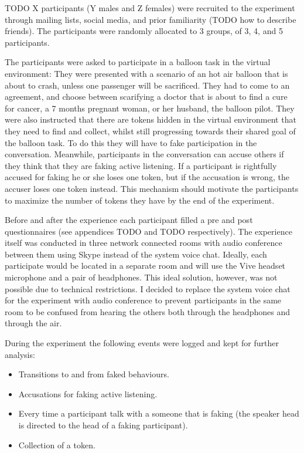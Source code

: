 \documentclass[]{simple-thesis}
\begin{document}
TODO X participants (Y males and Z females) were recruited to the experiment through mailing lists, social media, and prior familiarity (TODO how to describe friends).
The participants were randomly allocated to 3 groups, of 3, 4, and 5 participants.

The participants were asked to participate in a balloon task \citep{Howes2012} in the virtual environment:
They were presented with a scenario of an hot air balloon that is about to crash, unless one passenger will be sacrificed.
They had to come to an agreement, and choose between scarifying a doctor that is about to find a cure for cancer, a 7 months pregnant woman, or her husband, the balloon pilot.
They were also instructed that there are tokens hidden in the virtual environment that they need to find and collect, whilst still progressing towards their shared goal of the balloon task.
To do this they will have to fake participation in the conversation.
Meanwhile, participants in the conversation can accuse others if they think that they are faking active listening.
If a participant is rightfully accused for faking he or she loses one token, but if the accusation is wrong, the accuser loses one token instead.
This mechanism should motivate the participants to maximize the number of tokens they have by the end of the experiment.

Before and after the experience each participant filled a pre and post questionnaires (see appendices TODO and TODO respectively).
The experience itself was conducted in three network connected rooms with audio conference between them using Skype instead of the system voice chat.
Ideally, each participate would be located in a separate room and will use the Vive headset microphone and a pair of headphones.
This ideal solution, however, was not possible due to technical restrictions.
I decided to replace the system voice chat for the experiment with audio conference to prevent participants in the same room to be confused from hearing the others both through the headphones and through the air.

During the experiment the following events were logged and kept for further analysis:

\begin{itemize}
  \item Transitions to and from faked behaviours.
  \item Accusations for faking active listening.
  \item Every time a participant talk with a someone that is faking (the speaker head is directed to the head of a faking participant).
  \item Collection of a token.
\end{itemize}
\end{document}
